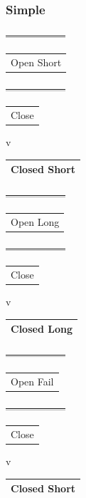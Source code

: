 \documentclass[11pt]{article}
\begin{document}
\subsubsection{Simple}
\label{sec:orgbcfd1a8}
\sout{------------------}
\begin{center}
\begin{tabular}{l}
Open Short\\[0pt]
\end{tabular}
\end{center}
\sout{------------------}
\begin{center}
\begin{tabular}{l}
Close\\[0pt]
\end{tabular}
\end{center}
v
\begin{center}
\begin{tabular}{|l|}
\hline
Closed Short \\
\hline
\end{tabular}
\end{center}

\sout{------------------}
\begin{center}
\begin{tabular}{l}
Open Long\\[0pt]
\end{tabular}
\end{center}
\sout{------------------}
\begin{center}
\begin{tabular}{l}
Close\\[0pt]
\end{tabular}
\end{center}
v
\begin{center}
\begin{tabular}{|l|}
\hline
Closed Long \\
\hline
\end{tabular}
\end{center}

\sout{------------------}
\begin{center}
\begin{tabular}{l}
Open Fail\\[0pt]
\end{tabular}
\end{center}
\sout{------------------}
\begin{center}
\begin{tabular}{l}
Close\\[0pt]
\end{tabular}
\end{center}
v
\begin{center}
\begin{tabular}{|l|}
\hline
Closed Short \\
\hline
\end{tabular}
\end{center}
\end{document}
